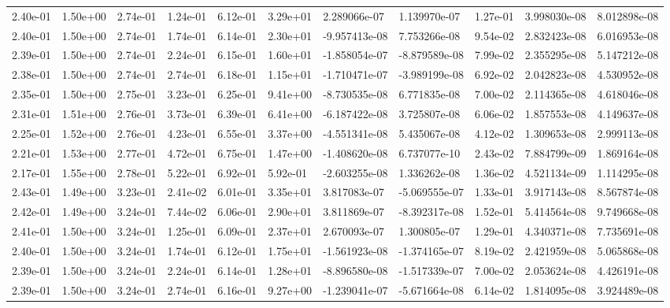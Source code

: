 \begin{longtable}{| p{} | p{} |}
2.40e-01 & 1.50e+00 & 2.74e-01 & 1.24e-01 & 6.12e-01 & 3.29e+01 &  2.289066e-07 &  1.139970e-07 &  1.27e-01 &  3.998030e-08 &  8.012898e-08 \\
2.40e-01 & 1.50e+00 & 2.74e-01 & 1.74e-01 & 6.14e-01 & 2.30e+01 & -9.957413e-08 &  7.753266e-08 &  9.54e-02 &  2.832423e-08 &  6.016953e-08 \\
2.39e-01 & 1.50e+00 & 2.74e-01 & 2.24e-01 & 6.15e-01 & 1.60e+01 & -1.858054e-07 & -8.879589e-08 &  7.99e-02 &  2.355295e-08 &  5.147212e-08 \\
2.38e-01 & 1.50e+00 & 2.74e-01 & 2.74e-01 & 6.18e-01 & 1.15e+01 & -1.710471e-07 & -3.989199e-08 &  6.92e-02 &  2.042823e-08 &  4.530952e-08 \\
2.35e-01 & 1.50e+00 & 2.75e-01 & 3.23e-01 & 6.25e-01 & 9.41e+00 & -8.730535e-08 &  6.771835e-08 &  7.00e-02 &  2.114365e-08 &  4.618046e-08 \\
2.31e-01 & 1.51e+00 & 2.76e-01 & 3.73e-01 & 6.39e-01 & 6.41e+00 & -6.187422e-08 &  3.725807e-08 &  6.06e-02 &  1.857553e-08 &  4.149637e-08 \\
2.25e-01 & 1.52e+00 & 2.76e-01 & 4.23e-01 & 6.55e-01 & 3.37e+00 & -4.551341e-08 &  5.435067e-08 &  4.12e-02 &  1.309653e-08 &  2.999113e-08 \\
2.21e-01 & 1.53e+00 & 2.77e-01 & 4.72e-01 & 6.75e-01 & 1.47e+00 & -1.408620e-08 &  6.737077e-10 &  2.43e-02 &  7.884799e-09 &  1.869164e-08 \\
2.17e-01 & 1.55e+00 & 2.78e-01 & 5.22e-01 & 6.92e-01 & 5.92e-01 & -2.603255e-08 &  1.336262e-08 &  1.36e-02 &  4.521134e-09 &  1.114295e-08 \\
2.43e-01 & 1.49e+00 & 3.23e-01 & 2.41e-02 & 6.01e-01 & 3.35e+01 &  3.817083e-07 & -5.069555e-07 &  1.33e-01 &  3.917143e-08 &  8.567874e-08 \\
2.42e-01 & 1.49e+00 & 3.24e-01 & 7.44e-02 & 6.06e-01 & 2.90e+01 &  3.811869e-07 & -8.392317e-08 &  1.52e-01 &  5.414564e-08 &  9.749668e-08 \\
2.41e-01 & 1.50e+00 & 3.24e-01 & 1.25e-01 & 6.09e-01 & 2.37e+01 &  2.670093e-07 &  1.300805e-07 &  1.29e-01 &  4.340371e-08 &  7.735691e-08 \\
2.40e-01 & 1.50e+00 & 3.24e-01 & 1.74e-01 & 6.12e-01 & 1.75e+01 & -1.561923e-08 & -1.374165e-07 &  8.19e-02 &  2.421959e-08 &  5.065868e-08 \\
2.39e-01 & 1.50e+00 & 3.24e-01 & 2.24e-01 & 6.14e-01 & 1.28e+01 & -8.896580e-08 & -1.517339e-07 &  7.00e-02 &  2.053624e-08 &  4.426191e-08 \\
2.39e-01 & 1.50e+00 & 3.24e-01 & 2.74e-01 & 6.16e-01 & 9.27e+00 & -1.239041e-07 & -5.671664e-08 &  6.14e-02 &  1.814095e-08 &  3.924489e-08 \\

\end{longtable}
